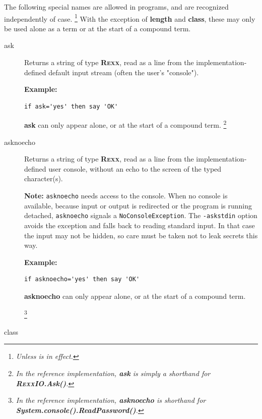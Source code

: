 The following special names are allowed in \nr{} programs, and are
recognized independently of case.
\footnote{
\emph{Unless  is in effect.
}
}
With the exception of \textbf{length} and \textbf{class}, these
may only be used alone as a term or at the start of a compound term.
\begin{description}
\item[ask]\label{refswask}
 
Returns a string of type \textbf{R\textsc{exx}}, read as a line from the
implementation-defined default input stream (often the user's
"console").

\textbf{Example:}
\begin{lstlisting}
if ask='yes' then say 'OK'
\end{lstlisting}
 \textbf{ask} can only appear alone, or at the start of a
compound term.
\footnote{
\emph{In the reference implementation, \textbf{ask} is simply a shorthand
for \textbf{R\textsc{exx}IO.Ask()}.}
}


\item[asknoecho]\label{refswasknoecho}
 
Returns a string of type \textbf{R\textsc{exx}}, read as a line from the
implementation-defined user console, without an echo to the screen of the typed character(s).

\textbf{Note: } \texttt{asknoecho} needs access to the console. When no console is
available, because input or output is redirected or the program is running
detached, \texttt{asknoecho} signals a \texttt{NoConsoleException}. The
\texttt{-askstdin} option avoids the exception and falls back to reading standard
input. In that case the input may not be hidden, so care must be taken not
to leak secrets this way.

\textbf{Example:}
\begin{lstlisting}
if asknoecho='yes' then say 'OK'
\end{lstlisting}
 \textbf{asknoecho} can only appear alone, or at the start of a
compound term.

\footnote{
\emph{In the reference implementation, \textbf{asknoecho} is shorthand
for \textbf{System.console().ReadPassword()}.}
}
\item[class]\label{refswclass}
 

\end{description}
